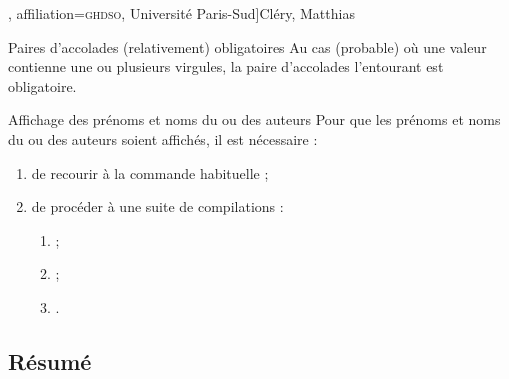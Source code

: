 \documentclass[french,nolocaltoc]{nwejmart}
\newtheorem[style=definition]{fait}
\newtheorem[title=expérience]{experience}
\newtheorem[title-plural=anneaux]{anneau}
\newtheorem[title=idéal,title-plural=idéaux]{ideal}
\begin{document}

\begin{bodycode}
\author[
  affiliation={Laboratoire \textsc{sphere}, Université Paris Diderot}
  ]{Bustamante, Martha-Cecilia}
\author[
  affiliation=[aff2]{\textsc{lpma}, Université Pierre et Marie Curie},
  affiliation={\textsc{ghdso}, Université Paris-Sud}]{Cléry, Matthias}
\author[
  affiliationtagged={aff2}
]{Mazliak, Laurent}
\end{bodycode}

\begin{dbwarning}{Paires d'accolades
    (relativement) obligatoires}{}
  Au cas (probable) où une valeur  contienne une ou plusieurs
  virgules, la paire d'accolades l'entourant est obligatoire.
\end{dbwarning}

\begin{dbwarning}{Affichage des prénoms et noms du ou des auteurs}{}
  Pour que les prénoms et noms du ou des auteurs soient affichés, il est
  nécessaire :
  \begin{enumerate}
  \item de recourir à la commande habituelle  ;
  \item de procéder à une suite de compilations\suitecompilations{} :
    \begin{enumerate}
    \item {} ;
    \item {} ;
    \item {}.
    \end{enumerate}
  \end{enumerate}
\end{dbwarning}

\subsection{Résumé}
\label{sec-resume}
\end{document}
